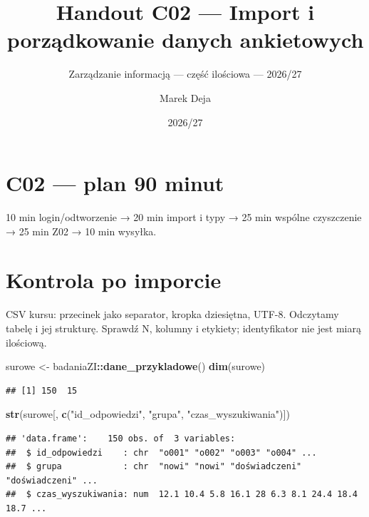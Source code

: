 \documentclass[
  polish,
  11pt,
  a4paper,
]{article}
\title{Handout C02 --- Import i porządkowanie danych ankietowych}
\subtitle{Zarządzanie informacją --- część ilościowa --- 2026/27}
\author{Marek Deja}
\date{2026/27}
\newenvironment{Shaded}{\begin{snugshade}}{\end{snugshade}}
\newcommand{\FunctionTok}[1]{\textcolor[rgb]{0.13,0.29,0.53}{\textbf{#1}}}
\newcommand{\NormalTok}[1]{#1}
\newcommand{\OtherTok}[1]{\textcolor[rgb]{0.56,0.35,0.01}{#1}}
\newcommand{\SpecialCharTok}[1]{\textcolor[rgb]{0.81,0.36,0.00}{\textbf{#1}}}
\newcommand{\StringTok}[1]{\textcolor[rgb]{0.31,0.60,0.02}{#1}}
\begin{document}
\maketitle

\section{C02 --- plan 90 minut}\label{c02-plan-90-minut}

10 min login/odtworzenie → 20 min import i typy → 25 min wspólne
czyszczenie → 25 min Z02 → 10 min wysyłka.

\section{Kontrola po imporcie}\label{kontrola-po-imporcie}

CSV kursu: przecinek jako separator, kropka dziesiętna, UTF-8. Odczytamy
tabelę i jej strukturę. Sprawdź N, kolumny i etykiety; identyfikator nie
jest miarą ilościową.

\begin{Shaded}
\begin{Highlighting}[]
\NormalTok{surowe }\OtherTok{\textless{}{-}}\NormalTok{ badaniaZI}\SpecialCharTok{::}\FunctionTok{dane\_przykladowe}\NormalTok{()}
\FunctionTok{dim}\NormalTok{(surowe)}
\end{Highlighting}
\end{Shaded}

\begin{verbatim}
## [1] 150  15
\end{verbatim}

\begin{Shaded}
\begin{Highlighting}[]
\FunctionTok{str}\NormalTok{(surowe[, }\FunctionTok{c}\NormalTok{(}\StringTok{"id\_odpowiedzi"}\NormalTok{, }\StringTok{"grupa"}\NormalTok{, }\StringTok{"czas\_wyszukiwania"}\NormalTok{)])}
\end{Highlighting}
\end{Shaded}

\begin{verbatim}
## 'data.frame':    150 obs. of  3 variables:
##  $ id_odpowiedzi    : chr  "o001" "o002" "o003" "o004" ...
##  $ grupa            : chr  "nowi" "nowi" "doświadczeni" "doświadczeni" ...
##  $ czas_wyszukiwania: num  12.1 10.4 5.8 16.1 28 6.3 8.1 24.4 18.4 18.7 ...
\end{verbatim}
\end{document}
